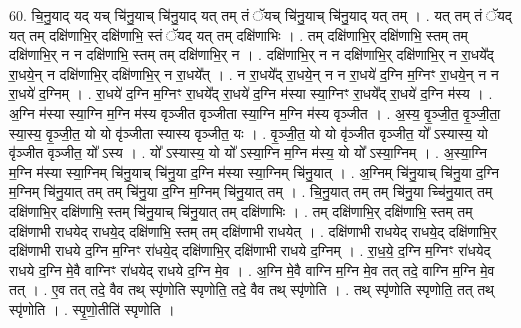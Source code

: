 \documentclass[17pt]{extarticle}
\begin{document}
60. चि॒नु॒याद् यद् यच् चि॑नु॒याच् चि॑नु॒याद् यत् तम् तं ॅयच् चि॑नु॒याच् चि॑नु॒याद् यत् तम् । . यत् तम् तं ॅयद् यत् तम् दक्षि॑णाभि॒र् दक्षि॑णाभि॒ स्तं ॅयद् यत् तम् दक्षि॑णाभिः । . तम् दक्षि॑णाभि॒र् दक्षि॑णाभि॒ स्तम् तम् दक्षि॑णाभि॒र् न न दक्षि॑णाभि॒ स्तम् तम् दक्षि॑णाभि॒र् न । . दक्षि॑णाभि॒र् न न दक्षि॑णाभि॒र् दक्षि॑णाभि॒र् न रा॒धये᳚द् रा॒धये॒न् न दक्षि॑णाभि॒र् दक्षि॑णाभि॒र् न रा॒धये᳚त् । . न रा॒धये᳚द् रा॒धये॒न् न न रा॒धये॑ द॒ग्नि म॒ग्निꣳ रा॒धये॒न् न न रा॒धये॑ द॒ग्निम् । . रा॒धये॑ द॒ग्नि म॒ग्निꣳ रा॒धये᳚द् रा॒धये॑ द॒ग्नि म॑स्या स्या॒ग्निꣳ रा॒धये᳚द् रा॒धये॑ द॒ग्नि म॑स्य । . अ॒ग्नि म॑स्या स्या॒ग्नि म॒ग्नि म॑स्य वृञ्जीत वृञ्जीता स्या॒ग्नि म॒ग्नि म॑स्य वृञ्जीत । . अ॒स्य॒ वृ॒ञ्जी॒त॒ वृ॒ञ्जी॒ता॒ स्या॒स्य॒ वृ॒ञ्जी॒त॒ यो यो वृ॑ञ्जीता स्यास्य वृञ्जीत॒ यः । . वृ॒ञ्जी॒त॒ यो यो वृ॑ञ्जीत वृञ्जीत॒ यो᳚ ऽस्यास्य॒ यो वृ॑ञ्जीत वृञ्जीत॒ यो᳚ ऽस्य । . यो᳚ ऽस्यास्य॒ यो यो᳚ ऽस्या॒ग्नि म॒ग्नि म॑स्य॒ यो यो᳚ ऽस्या॒ग्निम् । . अ॒स्या॒ग्नि म॒ग्नि म॑स्या स्या॒ग्निम् चि॑नु॒याच् चि॑नु॒या द॒ग्नि म॑स्या स्या॒ग्निम् चि॑नु॒यात् । . अ॒ग्निम् चि॑नु॒याच् चि॑नु॒या द॒ग्नि म॒ग्निम् चि॑नु॒यात् तम् तम् चि॑नु॒या द॒ग्नि म॒ग्निम् चि॑नु॒यात् तम् । . चि॒नु॒यात् तम् तम् चि॑नु॒या च्चि॑नु॒यात् तम् दक्षि॑णाभि॒र् दक्षि॑णाभि॒ स्तम् चि॑नु॒याच् चि॑नु॒यात् तम् दक्षि॑णाभिः । . तम् दक्षि॑णाभि॒र् दक्षि॑णाभि॒ स्तम् तम् दक्षि॑णाभी राधयेद् राधये॒द् दक्षि॑णाभि॒ स्तम् तम् दक्षि॑णाभी राधयेत् । . दक्षि॑णाभी राधयेद् राधये॒द् दक्षि॑णाभि॒र् दक्षि॑णाभी राधये द॒ग्नि म॒ग्निꣳ रा॑धये॒द् दक्षि॑णाभि॒र् दक्षि॑णाभी राधये द॒ग्निम् । . रा॒ध॒ये॒ द॒ग्नि म॒ग्निꣳ रा॑धयेद् राधये द॒ग्नि मे॒वै वाग्निꣳ रा॑धयेद् राधये द॒ग्नि मे॒व । . अ॒ग्नि मे॒वै वाग्नि म॒ग्नि मे॒व तत् तदे॒ वाग्नि म॒ग्नि मे॒व तत् । . ए॒व तत् तदे॒ वैव तथ् स्पृ॑णोति स्पृणोति॒ तदे॒ वैव तथ् स्पृ॑णोति । . तथ् स्पृ॑णोति स्पृणोति॒ तत् तथ् स्पृ॑णोति । . स्पृ॒णो॒तीति॑ स्पृणोति । \newline
\pagebreak
{}
\end{document}
